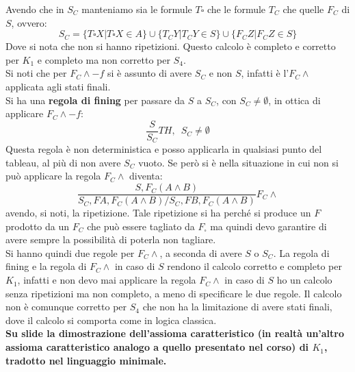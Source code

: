 \documentclass[a4paper,12pt, oneside]{book}
\begin{document}
Avendo che in $S_C$ manteniamo sia le formule $T\square$ che le formule $T_C$
che quelle $F_C$ di $S$, ovvero:
\[S_C=\{T\square X|T\square X\in A\}\cup\{T_CY|T_CY\in S\}
  \cup\{F_CZ|F_CZ\in S\}\] 
Dove si nota che non si hanno ripetizioni. Questo calcolo è completo e corretto
per $K_1$ e completo ma non corretto per $S_4$.\\
Si noti che per $F_C\land -f$ si è assunto di avere $S_C$ e non $S$, infatti è
l'$F_C\land$ applicata agli stati finali.\\
Si ha una \textbf{regola di fining} per passare da $S$ a $S_C$, con $S_C\neq
\emptyset$, in ottica di applicare $F_C\land -f$:
\[\frac{S}{S_C}TH,\,\,\,S_C\neq \emptyset\]
Questa regola è non
deterministica e posso applicarla in qualsiasi punto del tableau, al più di non
avere $S_C$ vuoto. Se però si è
nella situazione in cui non si può applicare la regola $F_C\land$ diventa:
\[\frac{S,F_C(A\land B)}{S_C,FA,F_C(A\land B)/S_C,FB,F_C(A\land B)}F_C\land\]
avendo, si noti, la ripetizione. Tale ripetizione si ha perché si produce un $F$
prodotto da un $F_C$ che può essere tagliato da $F_\square$ ma quindi devo
garantire di avere sempre la possibilità di poterla non tagliare.\\
Si hanno quindi due regole per $F_C\land$, a
seconda di avere $S$ o $S_C$. La regola di fining e la regola di $F_C\land$ in
caso di $S$ rendono il calcolo corretto e completo per $K_1$, infatti e non devo
mai applicare la regola $F_C\land$ in caso di $S$ ho un calcolo senza
ripetizioni ma non completo, a meno di specificare le due regole. Il calcolo non
è comunque corretto per $S_4$ che non ha la limitazione di avere stati finali,
dove il calcolo si comporta come in logica classica.\\
\textbf{Su slide la dimostrazione dell'assioma caratteristico (in realtà
  un'altro assioma caratteristico analogo a quello presentato nel corso) di
  $K_1$, tradotto nel linguaggio minimale.} 
\end{document}
